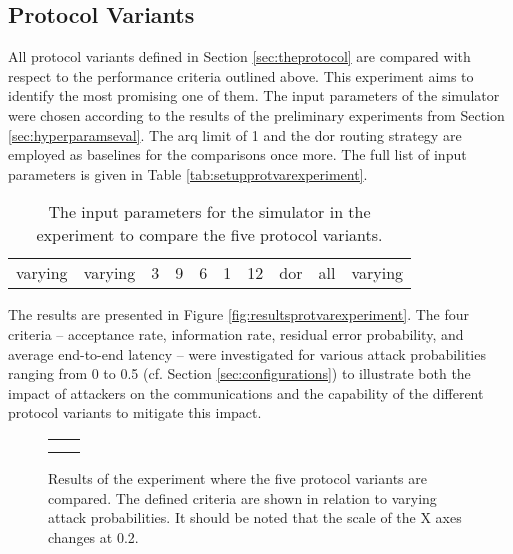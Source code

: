\subsection{Protocol Variants}\label{subsec:protocolvariantseval}
All protocol variants defined in Section \ref{sec:theprotocol} are compared with respect to the performance criteria outlined above. This experiment
aims to identify the most promising one of them. The input parameters of the simulator were chosen according to the results of the preliminary
experiments from Section \ref{sec:hyperparamseval}. The \gls{arq} limit of 1 and the \gls{dor} routing strategy are employed as baselines for the
comparisons once more. The full list of input parameters is given in Table \vref{tab:setupprotvarexperiment}.

\begin{table}
    \centering
    \begin{tabulary}{\textwidth}{C|C|C|C|C|C|C|C|C|C}
        \pProtVar{} & \pNCMode{} & \pEncMods{} & \pAuthMods{} & \pRQSize{} & \pARQLimit{} & \pARQTimeout{} & \pRStrat{} & \pAttackerSet{} & \pAttackProb{} \\\hline
        varying & varying & 3 & 9 & 6 & 1 & 12 & \gls{dor} & all & varying \\
    \end{tabulary}
    \caption[Input parameters for the protocol variant comparisons]{The input parameters for the simulator in the experiment to compare the five protocol
    variants.}
    \label{tab:setupprotvarexperiment}
\end{table}

The results are presented in Figure \vref{fig:resultsprotvarexperiment}. The four criteria -- acceptance rate, information rate, residual error
probability, and average end-to-end latency -- were investigated for various attack probabilities ranging from 0 to 0.5 (cf. Section
\ref{sec:configurations}) to illustrate both the impact of attackers on the communications and the capability of the different protocol variants to
mitigate this impact.

\begin{figure}
    \centering
    \begin{tabular}{cc}
         &  \\
         & 
    \end{tabular}
    \caption[Results for the protocol variant comparisons]{Results of the experiment where the five protocol variants are compared. The defined criteria
    are shown in relation to varying attack probabilities. It should be noted that the scale of the X axes changes at 0.2.}
    \label{fig:resultsprotvarexperiment}
\end{figure}

